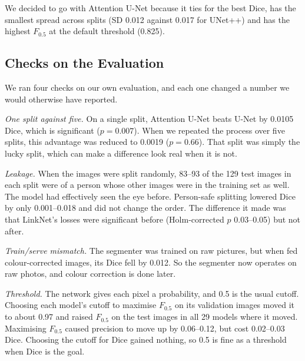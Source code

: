 \documentclass[conference]{IEEEtran}
\begin{document}
We decided to go with Attention U-Net because it ties for the best Dice, has the
smallest spread across splits (SD 0.012 against 0.017 for UNet++) and has the
highest $F_{0.5}$ at the default threshold (0.825).

\subsection{Checks on the Evaluation}
We ran four checks on our own evaluation, and each one changed a number we
would otherwise have reported.

\emph{One split against five.} On a single split, Attention U-Net beats U-Net
by 0.0105 Dice, which is significant ($p = 0.007$). When we repeated the
process over five splits, this advantage was reduced to 0.0019 ($p = 0.66$).
That split was simply the lucky split, which can make a difference look real
when it is not.

\emph{Leakage.} When the images were split randomly, 83--93 of the 129 test
images in each split were of a person whose other images were in the training
set as well. The model had effectively seen the eye before. Person-safe
splitting lowered Dice by only 0.001--0.018 and did not change the order. The
difference it made was that LinkNet's losses were significant before
(Holm-corrected $p$ 0.03--0.05) but not after.

\emph{Train/serve mismatch.} The segmenter was trained on raw pictures, but
when fed colour-corrected images, its Dice fell by 0.012. So the segmenter now
operates on raw photos, and colour correction is done later.

\emph{Threshold.} The network gives each pixel a probability, and 0.5 is the
usual cutoff. Choosing each model's cutoff to maximise $F_{0.5}$ on its
validation images moved it to about 0.97 and raised $F_{0.5}$ on the test
images in all 29 models where it moved. Maximising $F_{0.5}$ caused precision
to move up by 0.06--0.12, but cost 0.02--0.03 Dice. Choosing the cutoff for
Dice gained nothing, so 0.5 is fine as a threshold when Dice is the goal.
\end{document}
